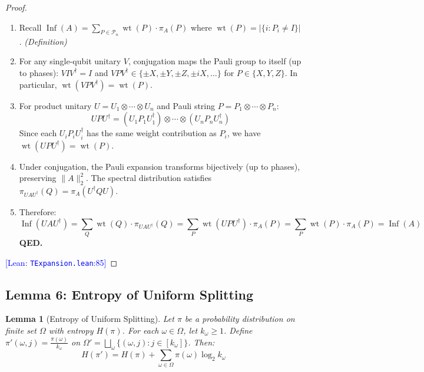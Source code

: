 \documentclass[11pt,a4paper]{article}
\theoremstyle{definition}
\theoremstyle{plain}
\newtheorem{lemma}[theorem]{Lemma}
\newcommand{\proofstep}[2]{\item[$\langle #1 \rangle$#2.]}
\newcommand{\leanref}[2]{\textcolor{blue}{\small [Lean: \texttt{#1}:#2]}}
\DeclareMathOperator{\Inf}{Inf}
\DeclareMathOperator{\wt}{wt}
\begin{document}
\begin{proof}
\begin{enumerate}[leftmargin=2em]
\proofstep{1}{1} Recall $\Inf(A) = \sum_{P \in \mathcal{P}_n} \wt(P) \cdot \pi_A(P)$ where $\wt(P) = |\{i : P_i \neq I\}|$. \textit{(Definition)}

\proofstep{1}{2} For any single-qubit unitary $V$, conjugation maps the Pauli group to itself (up to phases): $VIV^\dagger = I$ and $VPV^\dagger \in \{\pm X, \pm Y, \pm Z, \pm iX, \ldots\}$ for $P \in \{X, Y, Z\}$. In particular, $\wt(VPV^\dagger) = \wt(P)$.

\proofstep{1}{3} For product unitary $U = U_1 \otimes \cdots \otimes U_n$ and Pauli string $P = P_1 \otimes \cdots \otimes P_n$:
\[
UPU^\dagger = (U_1 P_1 U_1^\dagger) \otimes \cdots \otimes (U_n P_n U_n^\dagger)
\]
Since each $U_i P_i U_i^\dagger$ has the same weight contribution as $P_i$, we have $\wt(UPU^\dagger) = \wt(P)$.

\proofstep{1}{4} Under conjugation, the Pauli expansion transforms bijectively (up to phases), preserving $\|A\|_2^2$. The spectral distribution satisfies $\pi_{UAU^\dagger}(Q) = \pi_A(U^\dagger Q U)$.

\proofstep{1}{5} Therefore:
\[
\Inf(UAU^\dagger) = \sum_Q \wt(Q) \cdot \pi_{UAU^\dagger}(Q) = \sum_P \wt(UPU^\dagger) \cdot \pi_A(P) = \sum_P \wt(P) \cdot \pi_A(P) = \Inf(A)
\]
\textbf{QED.}
\end{enumerate}
\leanref{TExpansion.lean}{85}
\end{proof}

\subsection{Lemma 6: Entropy of Uniform Splitting}

\begin{lemma}[Entropy of Uniform Splitting] \label{lem:entropy}
Let $\pi$ be a probability distribution on finite set $\Omega$ with entropy $H(\pi)$. For each $\omega \in \Omega$, let $k_\omega \geq 1$. Define $\pi'(\omega, j) = \frac{\pi(\omega)}{k_\omega}$ on $\Omega' = \bigsqcup_\omega \{(\omega, j) : j \in [k_\omega]\}$. Then:
\[
H(\pi') = H(\pi) + \sum_{\omega \in \Omega} \pi(\omega) \log_2 k_\omega
\]
\end{lemma}
\end{document}
